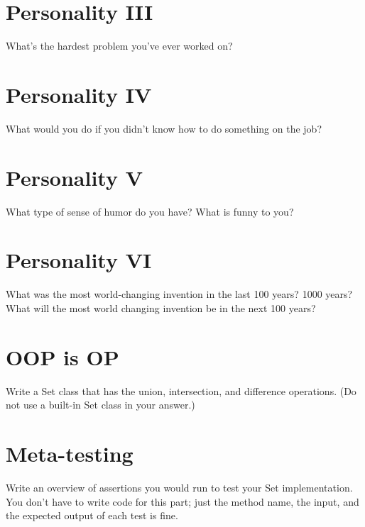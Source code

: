 \documentclass[12pt,runningheads]{article}
\begin{document}
\newpage

\section{Personality III}

What's the hardest problem you've ever worked on?

\newpage

\section{Personality IV}

What would you do if you didn't know how to do something on the job?

\newpage

\section{Personality V}

What type of sense of humor do you have? What is funny to you?

\newpage

\section{Personality VI}

What was the most world-changing invention in the last 100 years? 1000 years? What will the most world changing invention be in the next 100 years?

\newpage

\section{OOP is OP}

Write a Set class that has the union, intersection, and difference operations. (Do not use a built-in Set class in your answer.)

\newpage

\section{Meta-testing}

Write an overview of assertions you would run to test your Set implementation. You don't have to write code for this part; just the method name, the input, and the expected output of each test is fine.
\begin{comment}
Each method should be tested with:
Identical sets, different sets, empty sets, null and garbage arguments, etc.
\end{comment}
\end{document}

